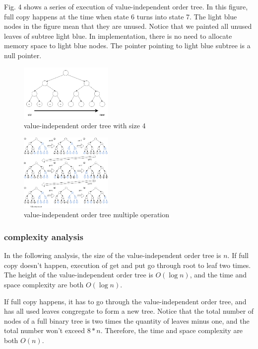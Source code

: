 \documentclass[conference]{IEEEtran}
\begin{document}
Fig. 4 shows a series of execution of value-independent order tree. In this figure, full copy happens at the time when state 6 turns into state 7. The light blue nodes in the figure mean that they are unused. Notice that we painted all unused leaves of subtree light blue.
In implementation, there is no need to allocate memory space to light blue nodes. The pointer pointing to light blue subtree is a null pointer.

\begin{figure}
  \centering
  \includegraphics[width=0.4\textwidth]{../images/order-tree}
  \caption{value-independent order tree with size 4}
\end{figure}

\begin{figure}
  \centering
  \includegraphics[width=0.4\textwidth]{../images/order-trees}
  \caption{value-independent order tree multiple operation}
\end{figure}

\subsubsection{complexity analysis}
In the following analysis, the size of the value-independent order tree is $n$.
If full copy doesn’t happen, execution of get and put go through root to leaf two times.
The height of the value-independent order tree is $O(\log n)$, and the time and space complexity are both $O(\log n)$.  

If full copy happens, it has to go through the value-independent order tree,
and has all used leaves congregate to form a new tree.
Notice that the total number of nodes of a full binary tree is two times the quantity of leaves minus one,
and the total number won’t exceed $8*n$.
Therefore, the time and space complexity are both $O(n)$.
\end{document}
